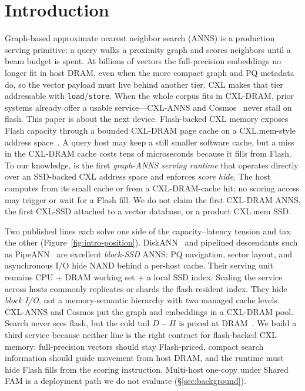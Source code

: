\section{Introduction}
\label{sec:intro}

Graph-based approximate nearest neighbor search (ANNS) is a production serving primitive: a query walks a proximity graph and scores neighbors until a beam budget is spent.
At billions of vectors the full-precision embeddings no longer fit in host DRAM, even when the more compact graph and PQ metadata do, so the vector payload must live behind another tier.
CXL makes that tier addressable with \texttt{load}/\texttt{store}.
When the whole corpus fits in CXL-DRAM, prior systems already offer a usable service---CXL-ANNS and Cosmos~\cite{cxlanns,cosmos} never stall on flash.
This paper is about the next device.
Flash-backed CXL memory exposes Flash capacity through a bounded CXL-DRAM page cache on a CXL.mem-style address space~\cite{skybyte,fromblocktobyte,cmmh,cxl31}.
A query host may keep a still smaller software cache, but a miss in the CXL-DRAM cache costs tens of microseconds because it fills from Flash.
To our knowledge, \sys{} is the first \emph{graph-ANNS serving runtime} that operates directly over an SSD-backed CXL address space and enforces \emph{score hide}.
The host computes from its small cache or from a CXL-DRAM-cache hit; no scoring access may trigger or wait for a Flash fill.
We do not claim the first CXL-DRAM ANNS, the first CXL-SSD attached to a vector database, or a product CXL.mem SSD.

Two published lines each solve one side of the capacity--latency tension and tax the other (Figure~\ref{fig:intro-position}).
DiskANN~\cite{diskann,freshdiskann} and pipelined descendants such as PipeANN~\cite{pipeann} are excellent \emph{block-SSD} ANNS: PQ navigation, sector layout, and asynchronous I/O hide NAND behind a per-host cache.
Their serving unit remains CPU $+$ DRAM working set $+$ a local SSD index.
Scaling the service across hosts commonly replicates or shards the flash-resident index.
They hide \emph{block I/O}, not a memory-semantic hierarchy with two managed cache levels.
CXL-ANNS and Cosmos put the graph and embeddings in a CXL-DRAM pool.
Search never sees flash, but the cold tail $D-H$ is priced at DRAM~\cite{bauhaus,secondtier}.
We build a third service because neither line is the right contract for flash-backed CXL memory: full-precision vectors should stay Flash-priced, compact search information should guide movement from host DRAM, and the runtime must hide Flash fills from the scoring instruction.
Multi-host one-copy under Shared FAM is a deployment path we do not evaluate (\S\ref{sec:background}).

